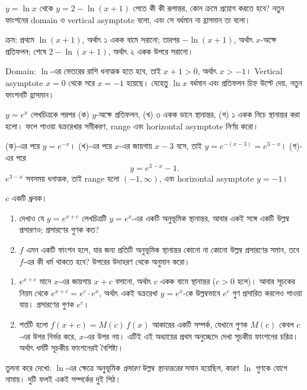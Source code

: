 \documentclass[11pt]{article}
\begin{document}
 $y = \ln x$ থেকে $y = 2 - \ln (x+1)$ পেতে কী কী রূপান্তর, কোন ক্রমে
প্রয়োগ করতে হবে? নতুন ফাংশনের domain ও vertical asymptote বলো, এবং সে বর্ধমান
না হ্রাসমান তা বলো।

\begin{sol}
ক্রম: প্রথমে $\ln(x+1)$, অর্থাৎ ১ একক বামে সরানো; তারপর $-\ln(x+1)$, অর্থাৎ
$x$-অক্ষে প্রতিফলন; শেষে $2 - \ln(x+1)$, অর্থাৎ ২ একক উপরে সরানো।

Domain: $\ln$-এর ভেতরের রাশি ধনাত্মক হতে হবে, তাই $x + 1 > 0$, অর্থাৎ
$x > -1$। Vertical asymptote $x = 0$ থেকে সরে $x = -1$ হয়েছে। যেহেতু $\ln x$
বর্ধমান এবং প্রতিফলন চিহ্ন উল্টে দেয়, নতুন ফাংশনটি হ্রাসমান।
\end{sol}

 $y = e^{x}$ লেখচিত্রকে পরপর (ক) $y$-অক্ষে প্রতিফলন, (খ) ৩ একক ডানে
স্থানান্তর, (গ) ১ একক নিচে স্থানান্তর করা হলো। ফলে পাওয়া বক্ররেখার সমীকরণ,
range এবং horizontal asymptote নির্ণয় করো।

\begin{sol}
(ক)-এর পরে $y = e^{-x}$। (খ)-এর পরে $x$-এর জায়গায় $x - 3$ বসে, তাই
$y = e^{-(x-3)} = e^{3-x}$। (গ)-এর পরে
\[
  y = e^{3-x} - 1 .
\]
$e^{3-x}$ সবসময় ধনাত্মক, তাই range হলো $(-1, \infty)$, এবং horizontal
asymptote $y = -1$।
\end{sol}

 $c$ একটি ধ্রুবক।
\begin{enumerate}
  \item দেখাও যে $y = e^{x+c}$ লেখচিত্রটি $y = e^{x}$-এর একটি অনুভূমিক
        স্থানান্তর, আবার একই সঙ্গে একটি উল্লম্ব প্রসারণও; প্রসারণের গুণক কত?
  \item $f$ এমন একটি ফাংশন হলে, যার জন্য প্রতিটি অনুভূমিক স্থানান্তর কোনো না
        কোনো উল্লম্ব প্রসারণের সমান, তবে $f$-এর কী ধর্ম থাকতে হবে? উপরের
        উদাহরণ থেকে অনুমান করো।
\end{enumerate}

\begin{sol}
\begin{enumerate}
  \item $e^{x+c}$ মানে $x$-এর জায়গায় $x + c$ বসানো, অর্থাৎ $c$ একক বামে
        স্থানান্তর ($c > 0$ হলে)। আবার সূচকের নিয়ম থেকে
        $e^{x+c} = e^{c} \cdot e^{x}$, অর্থাৎ একই বক্ররেখা $y = e^{x}$-কে
        উল্লম্বভাবে $e^{c}$ গুণ প্রসারিত করলেও পাওয়া যায়। প্রসারণের গুণক
        $e^{c}$।
  \item শর্তটি হলো $f(x + c) = M(c) \, f(x)$ আকারের একটি সম্পর্ক, যেখানে
        গুণক $M(c)$ কেবল $c$-এর উপর নির্ভর করে, $x$-এর উপর নয়। এটিই এই
        অধ্যায়ের প্রথম অনুচ্ছেদে দেখা সূচকীয় ফাংশনের চরিত্র। অর্থাৎ
        ধর্মটি সূচকীয় ফাংশনেরই বৈশিষ্ট্য।
\end{enumerate}
তুলনা করে দেখো: $\ln$-এর ক্ষেত্রে অনুভূমিক \emph{প্রসারণ} উল্লম্ব
\emph{স্থানান্তরের} সমান হয়েছিল, কারণ $\ln$ গুণকে যোগে নামায়। দুটি ফলই একই
সম্পর্কের দুই পিঠ।
\end{sol}
\end{document}
